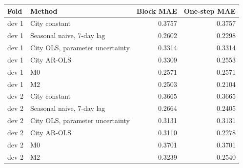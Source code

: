 \begin{tabular}{llrr}
\toprule
Fold & Method & Block MAE & One-step MAE \\
\midrule
dev 1 & City constant & 0.3757 & 0.3757 \\
dev 1 & Seasonal naive, 7-day lag & 0.2602 & 0.2298 \\
dev 1 & City OLS, parameter uncertainty & 0.3314 & 0.3314 \\
dev 1 & City AR-OLS & 0.3309 & 0.2553 \\
dev 1 & M0 & 0.2571 & 0.2571 \\
dev 1 & M2 & 0.2503 & 0.2104 \\
dev 2 & City constant & 0.3665 & 0.3665 \\
dev 2 & Seasonal naive, 7-day lag & 0.2664 & 0.2405 \\
dev 2 & City OLS, parameter uncertainty & 0.3131 & 0.3131 \\
dev 2 & City AR-OLS & 0.3110 & 0.2278 \\
dev 2 & M0 & 0.3701 & 0.3701 \\
dev 2 & M2 & 0.3239 & 0.2540 \\
\bottomrule
\end{tabular}
